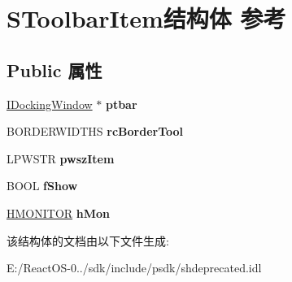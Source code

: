 \hypertarget{struct_s_toolbar_item}{}\section{S\+Toolbar\+Item结构体 参考}
\label{struct_s_toolbar_item}
\subsection*{Public 属性}
\begin{DoxyCompactItemize}
\item 
\mbox{\label{struct_s_toolbar_item_a0301decbafdc8819e1c400898efe9e9c}} 
\hyperlink{interface_i_docking_window}{I\+Docking\+Window} $\ast$ {\bfseries ptbar}
\item 
\mbox{\label{struct_s_toolbar_item_ae55630e58aea05d4c2f5093a0015cc74}} 
B\+O\+R\+D\+E\+R\+W\+I\+D\+T\+HS {\bfseries rc\+Border\+Tool}
\item 
\mbox{\label{struct_s_toolbar_item_a15e167e69f127fbc0b778c35253530ab}} 
L\+P\+W\+S\+TR {\bfseries pwsz\+Item}
\item 
\mbox{\label{struct_s_toolbar_item_ac21d3436f2b567407625086edcb7037d}} 
B\+O\+OL {\bfseries f\+Show}
\item 
\mbox{\label{struct_s_toolbar_item_a971c28807e1a7297dcc94b19cb9c166f}} 
\hyperlink{interfacevoid}{H\+M\+O\+N\+I\+T\+OR} {\bfseries h\+Mon}
\end{DoxyCompactItemize}


该结构体的文档由以下文件生成\+:\begin{DoxyCompactItemize}
\item 
E\+:/\+React\+O\+S-\/0../sdk/include/psdk/shdeprecated.\+idl\end{DoxyCompactItemize}
